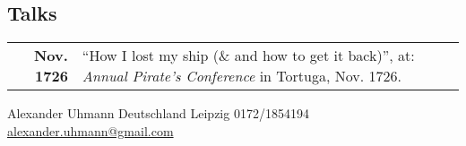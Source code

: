 \documentclass[lighthipster]{hipstercv}
\newlength{\rightcolwidth}
\begin{document}
\begin{paracol}{2}
\begin{minipage}[t]{0.3\textwidth}
\section*{Talks}
\begin{tabular}{>{\footnotesize\bfseries}r >{\footnotesize}p{}}
    Nov. 1726 & ``How I lost my ship (\& and how to get it back)'', at: \emph{Annual Pirate's Conference} in Tortuga, Nov. 1726.
\end{tabular}
\end{minipage}






\vfill{} %

\setlength{\parindent}{0pt}
\begin{minipage}[t]{\rightcolwidth}
\begin{center}\fontfamily{\sfdefault}\selectfont \color{black!70}
{\small Alexander Uhmann  Deutschland  Leipzig  0172/1854194 \newline{} \protect\url{alexander.uhmann@gmail.com}
}
\end{center}
\end{minipage}

\end{paracol}
\end{document}
